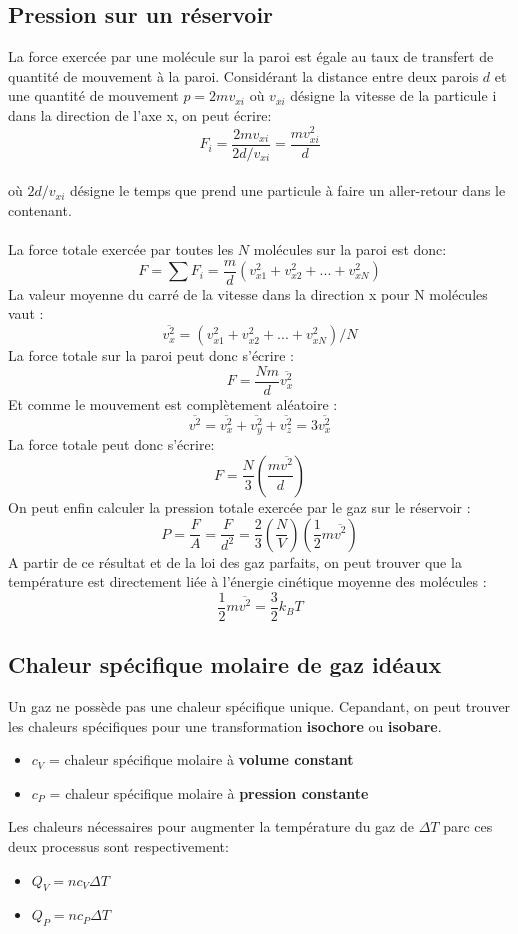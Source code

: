 \documentclass{article}
\begin{document}
    \subsection{Pression sur un réservoir}
        La force exercée par une molécule sur la paroi est égale au taux de transfert de quantité de mouvement à la paroi.
        Considérant la distance entre deux parois $d$ et une quantité de mouvement $p = 2 mv_{x i}$ où $v_{x i}$ désigne la vitesse de la particule i dans la direction de l'axe x, on peut écrire:
        $$
        F_i = \frac{2mv_{x i}}{2 d/v_{x i}} = \frac{mv_{x i}^2}{d}
        $$ \\
        où $2 d/v_{x i}$ désigne le temps que prend une particule à faire un aller-retour dans le contenant. \\\\
        La force totale exercée par toutes les $N$ molécules sur la paroi est donc:
        $$
        F = \sum F_i = \frac{m}{d} (v_{x1}^2 + v_{x2}^2 + ... + v_{xN}^2)
        $$
        La valeur moyenne du carré de la vitesse dans la direction x pour N molécules vaut :
        $$
        \overline{v_x^2} = (v_{x1}^2 + v_{x2}^2 + ... + v_{xN}^2) / N
        $$
        La force totale sur la paroi peut donc s'écrire :
        $$
        F = \frac{Nm}{d} \overline{v_x^2}
        $$
        Et comme le mouvement est complètement aléatoire :
        $$
        \overline{v^2} = \overline{v_x^2} + \overline{v_y^2} + \overline{v_z^2} = 3\overline{v_x^2}
        $$
        La force totale peut donc s'écrire:
        $$
        F = \frac{N}{3} (\frac{m\overline{v^2}}{d})
        $$ 
        On peut enfin calculer la pression totale exercée par le gaz sur le réservoir :
        $$
        P = \frac{F}{A} = \frac{F}{d^2} = \frac{2}{3} (\frac{N}{V}) (\frac{1}{2}m\overline{v^2})
        $$
        A partir de ce résultat et de la loi des gaz parfaits, on peut trouver que la température est directement liée à l'énergie cinétique moyenne des molécules :
        $$
        \frac{1}{2}m\overline{v^2} = \frac{3}{2} k_B T
        $$
    
    \subsection{Chaleur spécifique molaire de gaz idéaux}
        Un gaz ne possède pas une chaleur spécifique unique. Cepandant, on peut trouver les chaleurs spécifiques pour une transformation \textbf{isochore} ou \textbf{isobare}.
        \begin{itemize}
            \item $c_V$ = chaleur spécifique molaire à \textbf{volume constant}
            \item $c_P$ = chaleur spécifique molaire à \textbf{pression constante}
        \end{itemize}
        Les chaleurs nécessaires pour augmenter la température du gaz de $\Delta T$ parc ces deux processus sont respectivement:
        \begin{itemize}
            \item $Q_V = n c_V \Delta T$
            \item $Q_P = n c_P \Delta T$
        \end{itemize}
\end{document}
